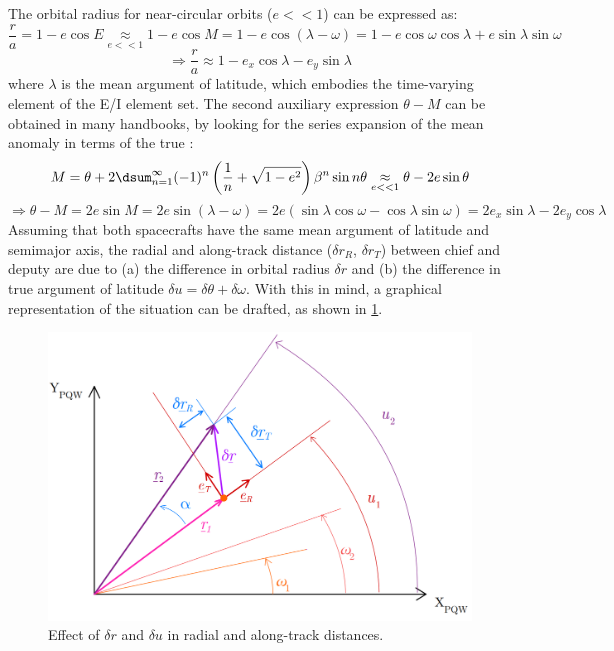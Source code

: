 			\indent The orbital radius for near-circular orbits ($e<<1$) can be expressed as:
			\[
			\dfrac{r}{a} = 1 -e\cos E \underset{e<<1}{\approx}  1 - e\cos M = 1 - e\cos\left(\lambda - \omega\right) = 1 - e\cos\omega \cos \lambda+ e \sin \lambda \sin\omega
			\]
			\begin{equation}
			\Rightarrow \dfrac{r}{a} \approx 1 - e_x \cos\lambda - e_y \sin \lambda
			\label{eqCh2:orbital_radius}
			\end{equation}
			\noindent where $\lambda$ is the mean argument of latitude, which embodies the time-varying element of the E/I element set. The second auxiliary expression $\theta - M$ can be obtained in many handbooks, by looking for the series expansion of the mean anomaly in terms of the true \cite{Battin}:
			\[
			M =\theta+ 2\dsum_{n=1}^{\infty} (-1)^{n} \left( \dfrac{1}{n} + \sqrt{1 - e^2} \right) \beta^n \sin n\theta \underset{e<<1}{\approx} \theta - 2 e \sin\theta\\
			\]
			\begin{equation}
			\Rightarrow \theta - M = 2 e\sin M = 2 e \sin\left(\lambda - \omega\right) = 2e\left(\sin\lambda\cos\omega - \cos\lambda\sin\omega\right) = 2 e_x\sin\lambda - 2 e_y \cos\lambda
			\label{eqCh2:M_expansion}
			\end{equation}
			\indent Assuming that both spacecrafts have the same mean argument of latitude and semimajor axis, the radial and along-track distance ($\delta r_R$, $\delta r_T$) between chief and deputy are due to (a) the difference in orbital radius $\delta r$ and (b) the difference in true argument of latitude $\delta u = \delta \theta + \delta \omega$. With this in mind, a graphical representation of the situation can be drafted, as shown in \ref{figCh2:ecc_effect}.
			\begin{figure}[!htb]
			\centering\includegraphics[width = 0.56\linewidth]{Chapters/Chapter_02/ecc_effect}
			\caption{Effect of $\delta r$ and $\delta u$ in radial and along-track distances.}
			\label{figCh2:ecc_effect}
			\end{figure}
